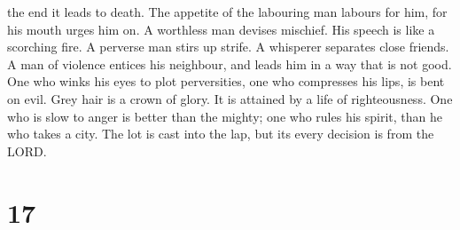 the end it leads to death.  The appetite of the labouring
man labours for him, for his mouth urges him on.  A
worthless man devises mischief. His speech is like a scorching fire.
 A perverse man stirs up strife. A whisperer separates
close friends.  A man of violence entices his neighbour,
and leads him in a way that is not good.  One who winks his
eyes to plot perversities, one who compresses his lips, is bent on evil.
 Grey hair is a crown of glory. It is attained by a life of
righteousness.  One who is slow to anger is better than the
mighty; one who rules his spirit, than he who takes a city.
 The lot is cast into the lap, but its every decision is
from the LORD.

\hypertarget{section-16}{%
\section{17}\label{section-16}}


